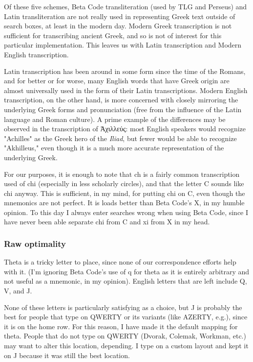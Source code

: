 \documentclass[11pt]{article}
\begin{document}
Of these five schemes, Beta Code transliteration (used by TLG and Perseus) and Latin transliteration are not really used in representing Greek text outside of search boxes, at least in the modern day. Modern Greek transcription is not sufficient for transcribing ancient Greek, and so is not of interest for this particular implementation. This leaves us with Latin transcription and Modern English transcription.

Latin transcription has been around in some form since the time of the Romans, and for better or for worse, many English words that have Greek origin are almost universally used in the form of their Latin transcriptions. Modern English transcription, on the other hand, is more concerned with closely mirroring the underlying Greek forms and pronunciation (free from the influence of the Latin language and Roman culture). A prime example of the differences may be observed in the transcription of Ἀχιλλεύς: most English speakers would recognize "Achilles" as the Greek hero of the \emph{Iliad}, but fewer would be able to recognize "Akhilleus," even though it is a much more accurate representation of the underlying Greek.

For our purposes, it is enough to note that ch is a fairly common transcription used of chi (especially in less scholarly circles), and that the letter C sounds like chi anyway. This is sufficient, in my mind, for putting chi on C, even though the mnemonics are not perfect. It is loads better than Beta Code's X, in my humble opinion. To this day I always enter searches wrong when using Beta Code, since I have never been able separate chi from C and xi from X in my head.

\subsubsection{Raw optimality}
\label{sec:orgf170715}

Theta is a tricky letter to place, since none of our correspondence efforts help with it. (I'm ignoring Beta Code's use of q for theta as it is entirely arbitrary and not useful as a mnemonic, in my opinion). English letters that are left include Q, V, and J.

None of these letters is particularly satisfying as a choice, but J is probably the best for people that type on QWERTY or its variants (like AZERTY, e.g.), since it is on the home row. For this reason, I have made it the default mapping for theta. People that do not type on QWERTY (Dvorak, Colemak, Workman, etc.) may want to alter this location, depending. I type on a custom layout and kept it on J because it was still the best location.
\end{document}
